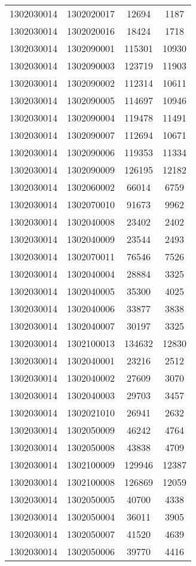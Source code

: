 \begin{longtable}[h]{llcc}
		1302030014 & 1302020017 & 12694 & 1187\\
		1302030014 & 1302020016 & 18424 & 1718\\
		1302030014 & 1302090001 & 115301 & 10930\\
		1302030014 & 1302090003 & 123719 & 11903\\
		1302030014 & 1302090002 & 112314 & 10611\\
		1302030014 & 1302090005 & 114697 & 10946\\
		1302030014 & 1302090004 & 119478 & 11491\\
		1302030014 & 1302090007 & 112694 & 10671\\
		1302030014 & 1302090006 & 119353 & 11334\\
		1302030014 & 1302090009 & 126195 & 12182\\
		1302030014 & 1302060002 & 66014 & 6759\\
		1302030014 & 1302070010 & 91673 & 9962\\
		1302030014 & 1302040008 & 23402 & 2402\\
		1302030014 & 1302040009 & 23544 & 2493\\
		1302030014 & 1302070011 & 76546 & 7526\\
		1302030014 & 1302040004 & 28884 & 3325\\
		1302030014 & 1302040005 & 35300 & 4025\\
		1302030014 & 1302040006 & 33877 & 3838\\
		1302030014 & 1302040007 & 30197 & 3325\\
		1302030014 & 1302100013 & 134632 & 12830\\
		1302030014 & 1302040001 & 23216 & 2512\\
		1302030014 & 1302040002 & 27609 & 3070\\
		1302030014 & 1302040003 & 29703 & 3457\\
		1302030014 & 1302021010 & 26941 & 2632\\
		1302030014 & 1302050009 & 46242 & 4764\\
		1302030014 & 1302050008 & 43838 & 4709\\
		1302030014 & 1302100009 & 129946 & 12387\\
		1302030014 & 1302100008 & 126869 & 12059\\
		1302030014 & 1302050005 & 40700 & 4338\\
		1302030014 & 1302050004 & 36011 & 3905\\
		1302030014 & 1302050007 & 41520 & 4639\\
		1302030014 & 1302050006 & 39770 & 4416\\

\end{longtable}
